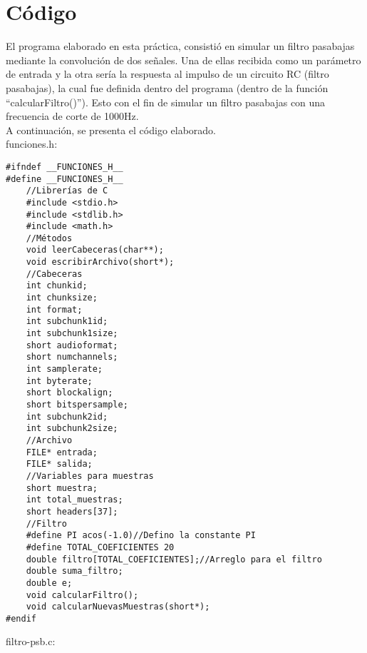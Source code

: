\section{Código}
El programa elaborado en esta práctica, consistió en simular un filtro pasabajas mediante la convolución de dos señales. Una de ellas recibida como un parámetro de entrada y la otra sería la respuesta al impulso de un circuito RC (filtro pasabajas), la cual fue definida dentro del programa (dentro de la función ``calcularFiltro()''). Esto con el fin de simular un filtro pasabajas con una frecuencia de corte de 1000Hz.\\ A continuación, se presenta el código elaborado.\\
funciones.h:
\begin{lstlisting}[style=CStyle]
#ifndef __FUNCIONES_H__
#define __FUNCIONES_H__	
	//Librerías de C
	#include <stdio.h>
	#include <stdlib.h>
	#include <math.h>
	//Métodos
	void leerCabeceras(char**);
	void escribirArchivo(short*);
	//Cabeceras
	int chunkid;
	int chunksize;
	int format;
	int subchunk1id;
	int subchunk1size;
	short audioformat;
	short numchannels;
	int samplerate;
	int byterate;
	short blockalign;
	short bitspersample;
	int subchunk2id;
	int subchunk2size;
	//Archivo
	FILE* entrada;
	FILE* salida;
	//Variables para muestras
	short muestra;
	int total_muestras;
	short headers[37];
	//Filtro
	#define PI acos(-1.0)//Defino la constante PI
	#define TOTAL_COEFICIENTES 20
	double filtro[TOTAL_COEFICIENTES];//Arreglo para el filtro
	double suma_filtro;
	double e;
	void calcularFiltro();
	void calcularNuevasMuestras(short*);
#endif
\end{lstlisting}
filtro-psb.c:
